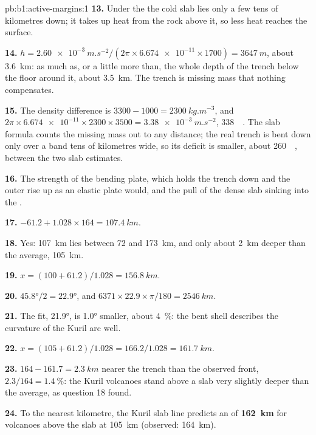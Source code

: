 \begin{solution}{pb:b1:active-margins:1}
\textbf{13.} Under the  the cold slab lies only a few tens of kilometres
down; it takes up heat from the rock above it, so less heat reaches the
surface.

\textbf{14.} $h = \qty{2.60e-3}{m.s^{-2}}/(2\pi\times\num{6.674e-11}\times1700)
= \qty{3647}{m}$, about \qty{3.6}{km}: as much as, or a little more than, the
whole depth of the trench below the floor around it, about \qty{3.5}{km}. The
trench is missing mass that nothing compensates.

\textbf{15.} The density difference is $3300 - 1000 = \qty{2300}{kg.m^{-3}}$,
and $2\pi\times\num{6.674e-11}\times2300\times3500 = \qty{3.38e-3}{m.s^{-2}}$,
\qty{338}{\milli\gal}. The slab formula counts the missing mass out to any
distance; the real trench is bent down only over a band tens of kilometres
wide, so its deficit is smaller, about \qty{260}{\milli\gal}, between the two
slab estimates.

\textbf{16.} The strength of the bending plate, which holds the trench down and
the outer rise up as an elastic plate would, and the pull of the dense slab
sinking into the .

\textbf{17.} $-61.2 + 1.028\times164 = \qty{107.4}{km}$.

\textbf{18.} Yes: \qty{107}{km} lies between 72 and \qty{173}{km}, and only
about \qty{2}{km} deeper than the average, \qty{105}{km}.

\textbf{19.} $x = (100 + 61.2)/1.028 = \qty{156.8}{km}$.

\textbf{20.} $\ang{45.8}/2 = \ang{22.9}$, and
$6371\times22.9\times\pi/180 = \qty{2546}{km}$.

\textbf{21.} The fit, \ang{21.9}, is \ang{1.0} smaller, about
\qty{4}{\percent}: the bent shell describes the curvature of the Kuril arc
well.

\textbf{22.} $x = (105 + 61.2)/1.028 = 166.2/1.028 = \qty{161.7}{km}$.

\textbf{23.} $164 - 161.7 = \qty{2.3}{km}$ nearer the trench than the observed
front, $2.3/164 = \qty{1.4}{\percent}$: the Kuril volcanoes stand above a slab
very slightly deeper than the average, as question 18 found.

\textbf{24.} To the nearest kilometre, the Kuril slab line predicts an
 of \textbf{\qty[text-series-to-math=true]{162}{km}} for
volcanoes above the slab at \qty{105}{km} (observed: \qty{164}{km}).
\end{solution}
